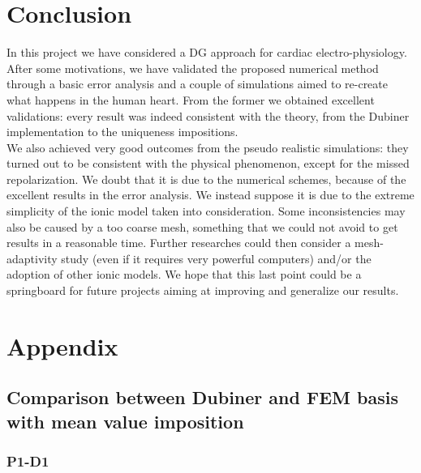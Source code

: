 \documentclass[a4paper,11pt]{article}
\begin{document}
\section{Conclusion}
In this project we have considered a DG approach for cardiac electro-physiology. After some motivations, we have validated the proposed numerical method through a basic error analysis and a couple of simulations aimed to re-create what happens in the human heart.
\noindent From the former we obtained excellent validations: every result was indeed consistent with the theory, from the Dubiner implementation to the uniqueness impositions.\\
\noindent We also achieved very good outcomes from the pseudo realistic simulations: they turned out to be consistent with the physical phenomenon, except for the missed repolarization. We doubt that it is due to the numerical schemes, because of the excellent results in the error analysis. We instead suppose it is due to the extreme simplicity of the ionic model taken into consideration. Some inconsistencies may also be caused by a too coarse mesh, something that we could not avoid to get results in a reasonable time. Further researches could then consider a mesh-adaptivity study (even if it requires very powerful computers) and/or the adoption of other ionic models.
\noindent We hope that this last point could be a springboard for future projects aiming at improving and generalize our results.
\newpage



\section{Appendix}
\subsection{Comparison between Dubiner and FEM basis with mean value imposition} \label{D1_P1_mean}
\subsubsection{P1-D1}
\end{document}
